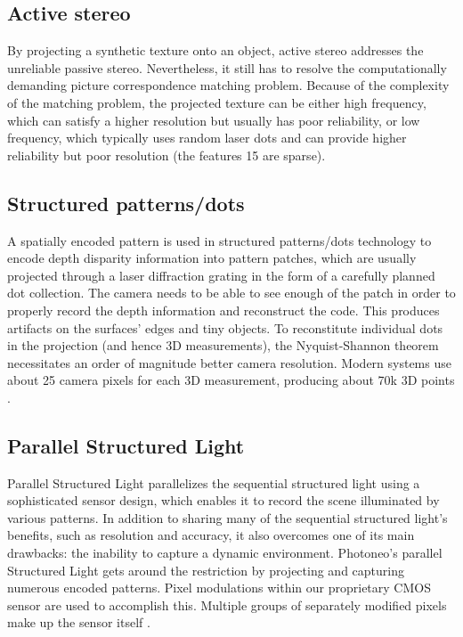 \documentclass[12pt]{article}
\begin{document}
\subsection{Active stereo}
By projecting a synthetic texture onto an object, active stereo addresses the unreliable passive stereo. Nevertheless, it still has to resolve the computationally demanding picture correspondence matching problem. Because of the complexity of the matching problem, the projected texture can be either high frequency, which can satisfy a higher resolution but usually has poor reliability, or low frequency, which typically uses random laser dots and can provide higher reliability but poor resolution (the features 15 are sparse)\cite{ref15}.

\subsection{Structured patterns/dots}
A spatially encoded pattern is used in structured patterns/dots technology to encode depth disparity information into pattern patches, which are usually projected through a laser diffraction grating in the form of a carefully planned dot collection. The camera needs to be able to see enough of the patch in order to properly record the depth information and reconstruct the code. This produces artifacts on the surfaces' edges and tiny objects. To reconstitute individual dots in the projection (and hence 3D measurements), the Nyquist-Shannon theorem necessitates an order of magnitude better camera resolution. Modern systems use about 25 camera pixels for each 3D measurement, producing about 70k 3D points \cite{ref15}. 

\subsection{Parallel Structured Light}

Parallel Structured Light parallelizes the sequential structured light using a sophisticated sensor design, which enables it to record the scene illuminated by various patterns. In addition to sharing many of the sequential structured light's benefits, such as resolution and accuracy, it also overcomes one of its main drawbacks: the inability to capture a dynamic environment. Photoneo's parallel Structured Light gets around the restriction by projecting and capturing numerous encoded patterns. Pixel modulations within our proprietary CMOS sensor are used to accomplish this. Multiple groups of separately modified pixels make up the sensor itself \cite{ref15}.  \\
\end{document}
